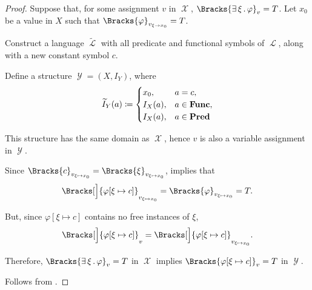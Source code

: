 \begin{proof}
  \SufficiencySubProof Suppose that, for some assignment \( v \) in \( \mscrX \), \( \Bracks{\qexists \xi \varphi}_v = T \). Let \( x_0 \) be a value in \( X \) such that \( \Bracks{\varphi}_{v_{\xi \to x_0}} = T \).

  Construct a language \( \widetilde \mscrL \) with all predicate and functional symbols of \( \mscrL \), along with a new constant symbol \( c \).

  Define a structure \( \mscrY = (X, I_Y) \), where
  \begin{equation*}
    \widetilde I_Y(a) \coloneqq \begin{cases}
      x_0,    &a = c, \\
      I_X(a), &a \in \operatorname{\mathbf{Func}}, \\
      I_X(a), &a \in \operatorname{\mathbf{Pred}}
    \end{cases}
  \end{equation*}

  This structure has the same domain as \( \mscrX \), hence \( v \) is also a variable assignment in \( \mscrY \).

  Since \( \Bracks{c}_{v_{\xi \mapsto x_0}} = \Bracks{\xi}_{v_{\xi \mapsto x_0}} \),  implies that
  \begin{equation*}
    \Bracks[\Big]{\varphi[\xi \mapsto c]}_{v_{\xi \mapsto x_0}} = \Bracks{\varphi}_{v_{\xi \mapsto x_0}} = T.
  \end{equation*}

  But, since \( \varphi[\xi \mapsto c] \) contains no free instances of \( \xi \),
  \begin{equation*}
    \Bracks[\Big]{\varphi[\xi \mapsto c]}_v = \Bracks[\Big]{\varphi[\xi \mapsto c]}_{v_{\xi \mapsto x_0}}.
  \end{equation*}

  Therefore, \( \Bracks{\qexists \xi \varphi}_v = T \) in \( \mscrX \) implies \( \Bracks{\varphi[\xi \mapsto c]}_v = T \) in \( \mscrY \).

  \NecessitySubProof Follows from .
\end{proof}

